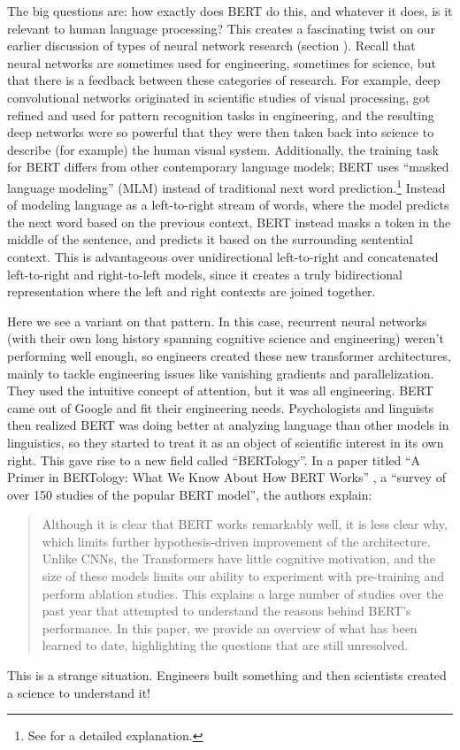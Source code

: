 The big questions are: how exactly does BERT do this, and whatever it does, is it relevant to human language processing?  This creates a fascinating twist on our earlier discussion of types of neural network research (section ). Recall that neural networks are sometimes used for engineering, sometimes for science, but that there is a feedback between these categories of research. For example, deep convolutional networks originated in scientific studies of visual processing, got refined and used for pattern recognition tasks in engineering, and the resulting deep networks were so powerful that they were then taken back into science  to describe (for example) the human visual system.
Additionally, the training task for BERT differs from other contemporary language models; BERT uses ``masked language modeling'' (MLM) instead of traditional next word prediction.\footnote{See \cite{devlin2018bert} for a detailed explanation.} Instead of modeling language as a left-to-right stream of words, where the model predicts the next word based on the previous context, BERT instead masks a token in the middle of the sentence, and predicts it based on the surrounding sentential context. This is advantageous over unidirectional left-to-right and concatenated left-to-right and right-to-left models, since it creates a truly bidirectional representation where the left and right contexts are joined together.

Here we see a variant on that pattern. In this case, recurrent neural networks (with their own long history spanning cognitive science and engineering) weren't performing well enough, so engineers created these new transformer architectures, mainly to tackle engineering issues like vanishing gradients and parallelization.  They used the intuitive concept of attention, but it was all engineering. BERT came out of Google and fit their engineering needs. Psychologists and linguists then realized  BERT was doing better at analyzing language than other models in linguistics, so they started to treat it as an object of scientific interest in its own right. This gave rise to a new field called ``BERTology''. In a paper titled ``A Primer in BERTology: What We Know About How BERT Works'' \cite{rogers2020primer}, a ``survey of over 150 studies of the popular BERT model'',  the authors explain:
\begin{quote}
Although it is clear that BERT works remarkably well, it is less clear why, which limits further hypothesis-driven improvement of the architecture. Unlike CNNs, the Transformers have little cognitive motivation, and the size of these models limits our ability to experiment with pre-training and perform ablation studies. This explains a large number of studies over the past year that attempted to understand the reasons behind BERT’s performance. In this paper, we provide an overview of what has been learned to date, highlighting the questions that are still unresolved.
\end{quote}
This is a strange situation. Engineers built something and then scientists created a science to understand it!  

